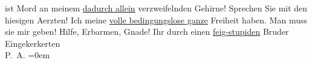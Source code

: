\begin{ledgroupsized}[t]{13cm}
               ist Mord an meinem {\pb}\uline{dadurch allein} verzweifelnden Gehirne! Sprechen Sie
                   mit den hiesigen Aerzten! Ich  meine \uline{volle bedingungslose
                  ganze} Freiheit haben. Man muss sie mir 
               geben! Hilfe, Erbarmen, Gnade!\pend
           \pstart
           Ihr durch einen \uline{feig-stupiden}{ }Bruder Eingekerkerten{\\[\baselineskip]}\spacefill\mbox{P. A.}\pend
           \leftskip=0em{}
         
         \endnumbering{}\end{ledgroupsized}  \newcommand{\dateiname}{L02124}\newcommand{\titel}{Peter Altenberg an Arthur Schnitzler, [19.? 4. 1913]}\newcommand{\editorInnen}{Martin Anton Müller und Gerd-Hermann Susen}
      